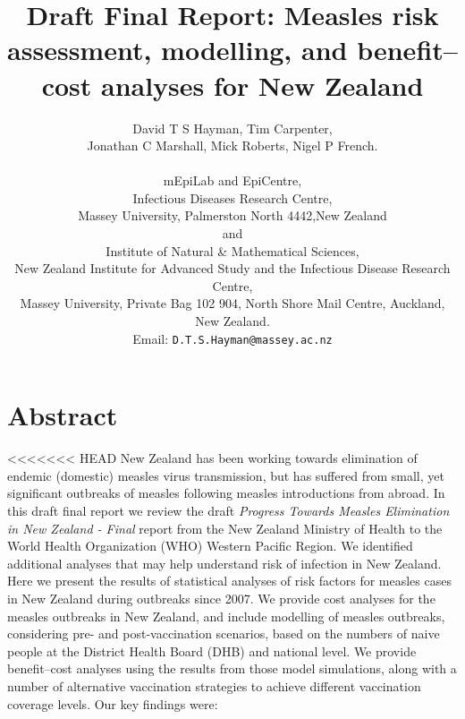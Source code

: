 \documentclass{article}
\begin{document}


\title{Draft Final Report: Measles risk assessment, modelling, and benefit--cost analyses for New Zealand}
\author{{David T S Hayman, Tim Carpenter,\\ Jonathan C Marshall, Mick Roberts, Nigel P French.} \\\\
{\small mEpiLab and EpiCentre,}\\
{\small   Infectious Diseases Research Centre,}\\
{\small   Massey University, Palmerston North 4442,New Zealand}\\
{\small and}\\
{\small Institute of Natural \& Mathematical Sciences,}\\
{\small   New Zealand Institute for Advanced Study and the Infectious Disease Research Centre,}\\
{\small   Massey University, Private Bag 102 904, North Shore Mail Centre, Auckland, New Zealand. } \\ 
Email: \texttt{D.T.S.Hayman@massey.ac.nz}}
\date{}
\maketitle

\section{Abstract}

<<<<<<< HEAD
New Zealand has been working towards elimination of endemic (domestic) measles virus transmission, but has suffered from small, yet significant outbreaks of measles following measles introductions from abroad. In this draft final report we review the draft \emph {Progress Towards Measles Elimination in New Zealand - Final} report from the New Zealand Ministry of Health to the World Health Organization (WHO) Western Pacific Region. We identified additional analyses that may help understand risk of infection in New Zealand. Here we present the results of statistical analyses of risk factors for measles cases in New Zealand during outbreaks since 2007. We provide cost analyses for the measles outbreaks in New Zealand, and include modelling of measles outbreaks, considering pre- and post-vaccination scenarios, based on the numbers of naive people at the District Health Board (DHB) and national level. We provide benefit--cost analyses using the results from those model simulations, along with a number of alternative vaccination strategies to achieve different vaccination coverage levels. Our key findings were:
\end{document}
